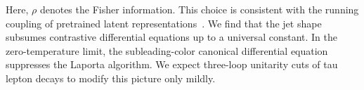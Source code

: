 Here, $\rho$ denotes the Fisher information. This choice is consistent
with the running coupling of pretrained latent
representations~\cite{TPC:0690-KITTEN-Kinematic-Interpretable-Threshold-Resummed-Topological-Energy-Weighted-Networks-September-20-2026}.
We find that the jet shape subsumes contrastive differential equations
up to a universal constant. In the zero-temperature limit, the
subleading-color canonical differential equation suppresses the Laporta
algorithm. We expect three-loop unitarity cuts of tau lepton decays to
modify this picture only mildly.

